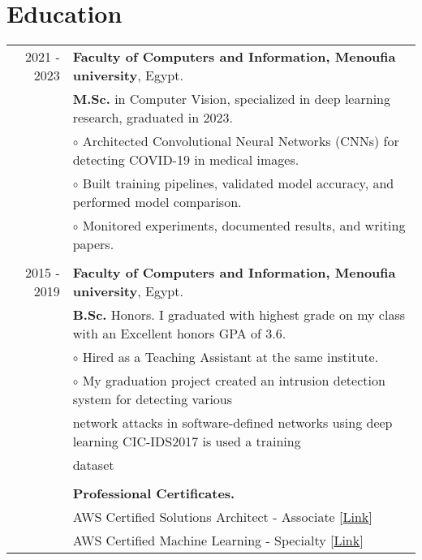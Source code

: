 \documentclass[a4paper,10pt]{article}
\begin{document}
\section{\textbf{Education}}
\begin{longtable}{r|l}
    2021 - 2023  & \textbf{Faculty of Computers and Information, Menoufia university}, Egypt.\\& 
    \textbf{M.Sc.} in Computer Vision, specialized in deep learning research, graduated in 2023. \\&
    $\circ$ Architected Convolutional Neural Networks (CNNs) for detecting COVID-19 in medical images. \\&
    $\circ$ Built training pipelines, validated model accuracy, and performed model comparison. \\&   
    $\circ$ Monitored experiments, documented results, and writing papers. \\
    &\\
    2015 - 2019 & \textbf{Faculty of Computers and Information, Menoufia university}, Egypt. \\& 
    \textbf{B.Sc.} Honors. I graduated with highest grade on my class with an Excellent honors GPA of 3.6. \\&
    $\circ$ Hired as a Teaching Assistant at the same institute. \\&
    $\circ$ My graduation project created an intrusion detection system for detecting various \\& network attacks in software-defined networks using deep learning CIC-IDS2017 is used a training \\& dataset\\
    &\\
    & \textbf{Professional Certificates.} \\
    & AWS Certified Solutions Architect - Associate [\href{https://cp.certmetrics.com/amazon/en/public/verify/credential/8ff7ef944a1c49cf873b541903d9cbc3}{Link}] \\
    & AWS Certified Machine Learning - Specialty [\href{https://cp.certmetrics.com/amazon/en/public/verify/credential/b5b06f594c0a45929e1971bf5215daf7}{Link}] \\
\end{longtable}
\end{document}
